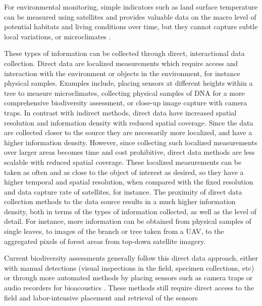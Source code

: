 For environmental monitoring, simple indicators such as land surface temperature can be measured using satellites and provides valuable data on the macro level of potential habitats and living conditions over time, but they cannot capture  subtle local variations, or microclimates \cite{Frenne2021, Zellweger2019AdvancesSensing}.




These types of information can be collected through direct, interactional data collection. Direct data are localized measurements which require access and interaction with the environment or objects in the environment, for instance physical samples. Examples include, placing sensors at different heights within a tree to measure microclimates, collecting physical samples of DNA for a more comprehensive biodiversity assessment, or close-up image capture with camera traps. In contrast with indirect methods, direct data have increased spatial resolution and information density with reduced spatial coverage. Since the data are collected closer to the source they are necessarily more localized, and have a higher information density. However, since collecting such localized measurements over larger areas becomes time and cost prohibitive, direct data methods are less scalable with reduced spatial coverage. These localized measurements can be taken as often and as close to the object of interest as desired, so  they have a higher temporal and spatial resolution, when compared with the fixed resolution and data capture rate of satellites, for instance. The proximity of direct data collection methods to the data source results in a much higher information density, both in terms of the types of information collected, as well as the level of detail. For instance, more information can be obtained from physical samples of single leaves, to images of the branch or tree taken from a UAV, to the aggregated pixels of forest areas from top-down satellite imagery.

Current biodiversity assessments generally follow this direct data approach, either with manual detections (visual inspections in the field, specimen collections, etc) or through more automated methods by placing sensors such as camera traps or audio recorders for bioacoustics \cite{Muller2023}. These methods still require direct access to the field and labor-intensive placement and retrieval of the sensors

